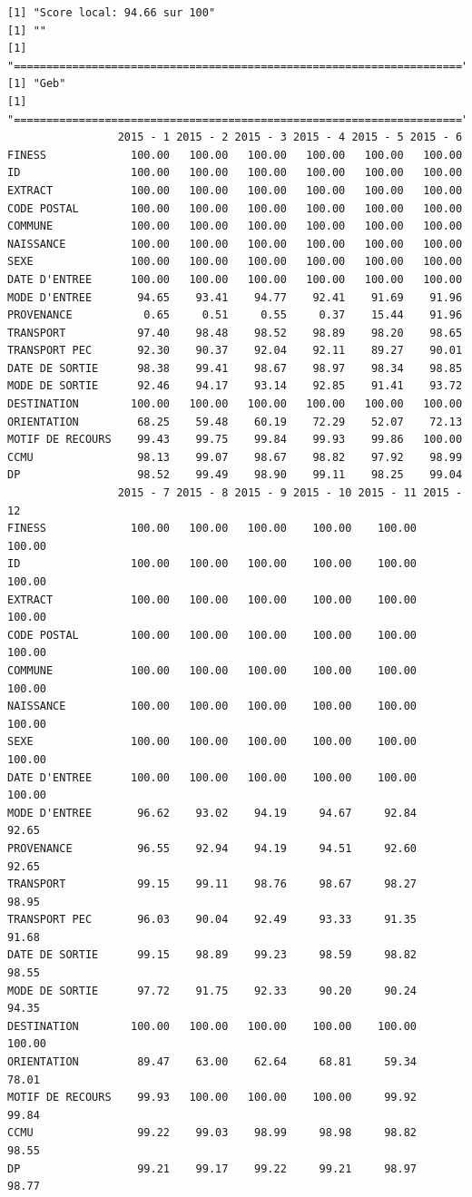 \documentclass[]{article}
\begin{document}
\begin{verbatim}
[1] "Score local: 94.66 sur 100"
[1] ""
[1] "====================================================================="
[1] "Geb"
[1] "====================================================================="
                 2015 - 1 2015 - 2 2015 - 3 2015 - 4 2015 - 5 2015 - 6
FINESS             100.00   100.00   100.00   100.00   100.00   100.00
ID                 100.00   100.00   100.00   100.00   100.00   100.00
EXTRACT            100.00   100.00   100.00   100.00   100.00   100.00
CODE POSTAL        100.00   100.00   100.00   100.00   100.00   100.00
COMMUNE            100.00   100.00   100.00   100.00   100.00   100.00
NAISSANCE          100.00   100.00   100.00   100.00   100.00   100.00
SEXE               100.00   100.00   100.00   100.00   100.00   100.00
DATE D'ENTREE      100.00   100.00   100.00   100.00   100.00   100.00
MODE D'ENTREE       94.65    93.41    94.77    92.41    91.69    91.96
PROVENANCE           0.65     0.51     0.55     0.37    15.44    91.96
TRANSPORT           97.40    98.48    98.52    98.89    98.20    98.65
TRANSPORT PEC       92.30    90.37    92.04    92.11    89.27    90.01
DATE DE SORTIE      98.38    99.41    98.67    98.97    98.34    98.85
MODE DE SORTIE      92.46    94.17    93.14    92.85    91.41    93.72
DESTINATION        100.00   100.00   100.00   100.00   100.00   100.00
ORIENTATION         68.25    59.48    60.19    72.29    52.07    72.13
MOTIF DE RECOURS    99.43    99.75    99.84    99.93    99.86   100.00
CCMU                98.13    99.07    98.67    98.82    97.92    98.99
DP                  98.52    99.49    98.90    99.11    98.25    99.04
                 2015 - 7 2015 - 8 2015 - 9 2015 - 10 2015 - 11 2015 - 12
FINESS             100.00   100.00   100.00    100.00    100.00    100.00
ID                 100.00   100.00   100.00    100.00    100.00    100.00
EXTRACT            100.00   100.00   100.00    100.00    100.00    100.00
CODE POSTAL        100.00   100.00   100.00    100.00    100.00    100.00
COMMUNE            100.00   100.00   100.00    100.00    100.00    100.00
NAISSANCE          100.00   100.00   100.00    100.00    100.00    100.00
SEXE               100.00   100.00   100.00    100.00    100.00    100.00
DATE D'ENTREE      100.00   100.00   100.00    100.00    100.00    100.00
MODE D'ENTREE       96.62    93.02    94.19     94.67     92.84     92.65
PROVENANCE          96.55    92.94    94.19     94.51     92.60     92.65
TRANSPORT           99.15    99.11    98.76     98.67     98.27     98.95
TRANSPORT PEC       96.03    90.04    92.49     93.33     91.35     91.68
DATE DE SORTIE      99.15    98.89    99.23     98.59     98.82     98.55
MODE DE SORTIE      97.72    91.75    92.33     90.20     90.24     94.35
DESTINATION        100.00   100.00   100.00    100.00    100.00    100.00
ORIENTATION         89.47    63.00    62.64     68.81     59.34     78.01
MOTIF DE RECOURS    99.93   100.00   100.00    100.00     99.92     99.84
CCMU                99.22    99.03    98.99     98.98     98.82     98.55
DP                  99.21    99.17    99.22     99.21     98.97     98.77
\end{verbatim}
\end{document}
